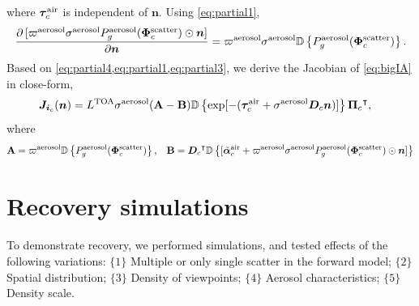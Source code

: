 \documentclass[10pt,letterpaper]{article}
\newcommand{\abbrev}[1]{\rm{#1}}
\newcommand{\PartDeriv}[2]{\frac{\partial{#1}}{\partial{#2}}}
\newcommand{\vect}[1]{\bm{#1}}
\newcommand{\transpose}[1]{{#1}^\intercal}
\newcommand{\OpDiag}[1]{\mathbb{D}\left\{#1\right\}}
\begin{document}
where $\vect{\tau}_c^{\rm air}$ is independent of ${\bm n}$. Using
\cref{eq:partial1},
\begin{align}
  \label{eq:partial3}
  \PartDeriv{\, [\varpi^{\rm aerosol}\sigma^{\rm aerosol} P^{\rm
      aerosol}_g(\vect{\Phi}^{\rm scatter}_c) \odot{\bm n}]}{\vect{n}}
  = \varpi^{\rm aerosol}\sigma^{\rm aerosol}\OpDiag{P^{\rm
      aerosol}_g(\vect{\Phi}^{\rm scatter}_c)}.
\end{align}
Based on \cref{eq:partial4,eq:partial1,eq:partial3},
we derive the Jacobian of \cref{eq:bigIA} in close-form,
\begin{align}
  {\bm J}_{{\bm i}_c}({\bm n}) &= L^{\rm TOA}{\sigma}^{\rm
    aerosol}({\bf A}-{\bf B}) \OpDiag{\exp[-(\vect{\tau}_c^{\rm air} +
    {\sigma}^{\rm aerosol} {\bm D}_c {\bm n})]}
  \transpose{{\vect{\Pi}}_c} ,
  \label{eq:gradient2}
\end{align}
where
\begin{equation}
  \label{eq:gradient3}
  {\bf A} = \varpi^{\rm aerosol}
  \OpDiag{ P_g^{\rm aerosol}(\vect{\Phi}^{\rm scatter}_c)}
  ,\;\;\;
  {\bf B} = \transpose{{\bm D}_c}
  \OpDiag{[\tilde{\vect{\alpha}}^{\rm air}_c + \varpi^{\rm
      aerosol}\sigma^{\rm aerosol} P^{\rm aerosol}_g(\vect{\Phi}^{\rm
      scatter}_c) \odot{\bm n}    ]}
\end{equation}


\section{Recovery simulations}
\label{sec:optimization-results}

To demonstrate recovery, we performed simulations, and tested effects of the following variations:
$\{1\}$ Multiple or only single scatter in the forward model;
$\{2\}$ Spatial distribution;
$\{3\}$ Density of viewpoints;
$\{4\}$ Aerosol characteristics;
$\{5\}$ Density scale.
\end{document}
